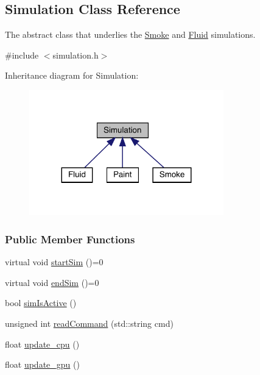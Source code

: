 \hypertarget{classSimulation}{}\subsection{Simulation Class Reference}
\label{classSimulation}


The abstract class that underlies the \mbox{\hyperlink{classSmoke}{Smoke}} and \mbox{\hyperlink{classFluid}{Fluid}} simulations.  




{\ttfamily \#include $<$simulation.\+h$>$}



Inheritance diagram for Simulation\+:\nopagebreak
\begin{figure}[H]
\begin{center}
\leavevmode
\includegraphics[width=239pt]{classSimulation__inherit__graph}
\end{center}
\end{figure}
\subsubsection*{Public Member Functions}
\begin{DoxyCompactItemize}
\item 
virtual void \mbox{\hyperlink{classSimulation_ac523544ffc2b4cffed1d2a6ead5809b1}{start\+Sim}} ()=0
\item 
virtual void \mbox{\hyperlink{classSimulation_ab496d124202f55e741db7db9a304a7ee}{end\+Sim}} ()=0
\item 
bool \mbox{\hyperlink{classSimulation_a0b951a01d3de845823d2a87b0d50adef}{sim\+Is\+Active}} ()
\item 
unsigned int \mbox{\hyperlink{classSimulation_a04cafb2071be521281c2584fa300b912}{read\+Command}} (std\+::string cmd)
\item 
float \mbox{\hyperlink{classSimulation_a36aefdee44fabe9b8070363ca9eb80a7}{update\+\_\+cpu}} ()
\item 
float \mbox{\hyperlink{classSimulation_a16ab6b7e3c5936bae78fc8c2daf658d2}{update\+\_\+gpu}} ()
\end{DoxyCompactItemize}
